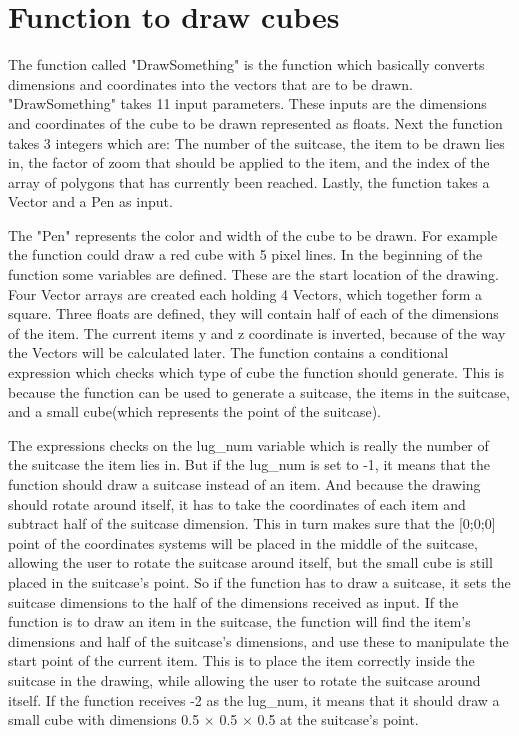 \section{Function to draw cubes}
\label{sec:cube}
The function called "DrawSomething" is the function which basically converts dimensions and coordinates into the vectors that are to be drawn.
"DrawSomething" takes 11 input parameters. These inputs are the dimensions and coordinates of the cube to be drawn represented as floats. Next the function takes 3 integers which are: The number of the suitcase, the item to be drawn lies in, the factor of zoom that should be applied to the item, and the index of the array of polygons that has currently been reached. Lastly, the function takes a Vector and a Pen as input.

The "Pen" represents the color and width of the cube to be drawn. For example the function could draw a red cube with 5 pixel lines. In the beginning of the function some variables are defined. These are the start location of the drawing. Four Vector arrays are created each holding 4 Vectors, which together form a square.
Three floats are defined, they will contain half of each of the dimensions of the item.
The current items y and z coordinate is inverted, because of the way the Vectors will be calculated later. 
The function contains a conditional expression which checks which type of cube the function should generate. This is because the function can be used to generate a suitcase, the items in the suitcase, and a small cube(which represents the  point of the suitcase). 

The expressions checks on the lug\_num variable which is really the number of the suitcase the item lies in. But if the lug\_num is set to -1, it means that the function should draw a suitcase instead of an item. And because the drawing should rotate around itself, it has to take the coordinates of each item and subtract half of the suitcase dimension. This in turn makes sure that the [0;0;0] point of the coordinates systems will be placed in the middle of the suitcase, allowing the user to rotate the suitcase around itself, but the small cube is still placed in the suitcase's  point.
So if the function has to draw a suitcase, it sets the suitcase dimensions to the half of the dimensions received as input.
If the function is to draw an item in the suitcase, the function will find the item's dimensions and half of the suitcase's dimensions, and use these to manipulate the start point of the current item. This is to place the item correctly inside the suitcase in the drawing, while allowing the user to rotate the suitcase around itself. 
If the function receives -2 as the lug\_num, it means that it should draw a small cube with dimensions 0.5 × 0.5 × 0.5 at the suitcase's  point.

